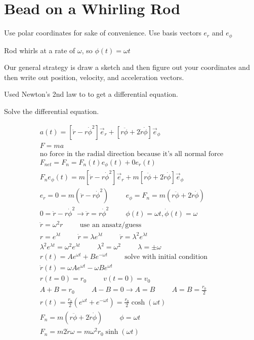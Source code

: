 \documentclass[fleqn]{report}
\newcommand{\hp}{\hspace{1cm}}
\newcommand{\equations} [1] {
\begin{gather*}
#1
\end{gather*}
}
\begin{document}
\section{Bead on a Whirling Rod}
Use polar coordinates for sake of convenience. 
Use basis vectors $e_r$ and $e_\phi$

Rod whirls at a rate of $\omega$, so $\phi(t) = \omega t$

Our general strategy is draw a sketch and then figure out 
your coordinates and then write out position, velocity, and 
acceleration vectors.

Used Newton's 2nd law to to get a differential equation.

Solve the differential equation.
\equations{
    a(t) = [\ddot r - r \dot \phi^2] \vec e_r + 
    [r \ddot \phi + 2 \dot r \dot \phi] \vec e_\phi 
    \\
    F = ma 
    \\
    \textrm{no force in the radial direction because 
    it's all normal force}
    \\
    F_{net} = F_n = F_n(t) e_\phi(t) + 0 e_r(t)
    \\
    F_n e_\phi (t) = m [\ddot r - r \dot \phi^2] \vec e_r + 
    m[r \ddot \phi + 2 \dot r \dot \phi] \vec e_\phi 
    \\
    e_r = 0 = m (\ddot r - r \dot \phi^2)
    \hp 
    e_\phi = F_n = m (r \ddot \phi + 2 \dot r \dot \phi )
    \\
    0 = \ddot r - r \dot \phi^2 \rightarrow
    \ddot r = r \dot \phi^2 \hp 
    \phi(t) = \omega t, \dot \phi(t) = \omega
    \\
    \ddot r = \omega^2 r
    \hp 
    \textrm{use an ansatz/guess}
    \\
    r = e^{\lambda t} \hp 
    \dot r = \lambda e^{\lambda t} \hp 
    \ddot r = \lambda^2 e^{\lambda t}
    \\
    \lambda^2 e^{\lambda t} = \omega^2 e^{\lambda t}
    \hp \lambda^2 = \omega^2
    \hp \lambda = \pm \omega 
    \\
    r(t) = Ae^{\omega t} + B e^{- \omega t}
    \hp \textrm{solve with initial condition}
    \\
    \dot r(t) = \omega A e^{\omega t} - \omega B e^{\omega t}
    \\
    r(t = 0) = r_0 
    \hp v(t = 0) = v_0
    \\
    A + B = r_0
    \hp A - B = 0
    \rightarrow 
    A = B
    \hp A = B = \frac{r_0}{2}
    \\
    r(t) = \frac{r_0}{2} 
    (e^{\omega t} + e^{-\omega t})
    =
    \frac{r_0}{2} \cosh(\omega t)
    \\
    F_n = m (r \ddot \phi + 2 \dot r \dot \phi)
    \hp \phi = \omega t
    \\
    F_n = m2 \dot r \omega 
    = m \omega^2 r_0 \sinh(\omega t) 
}
\end{document}
